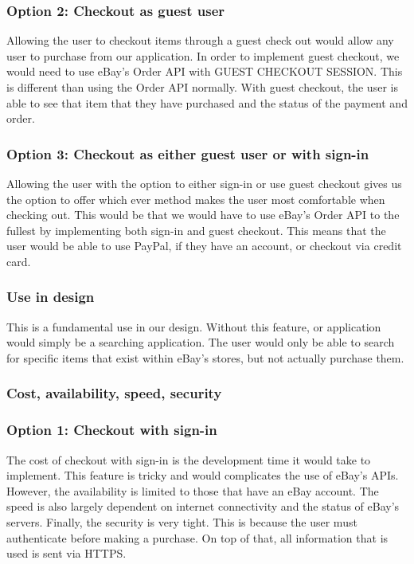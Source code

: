 \documentclass[journal,compsoc, 10pt, draftclsnofoot, onecolumn]{IEEEtran}
\begin{document}
\subsubsection*{Option 2: Checkout as guest user}
Allowing the user to checkout items through a guest check out would allow any
user to purchase from our application. In order to implement guest checkout, we
would need to use eBay's Order API with GUEST CHECKOUT SESSION. This is
different than using the Order API normally. With guest checkout, the user is
able to see that item that they have purchased and the status of the payment and
 order.

\subsubsection*{Option 3: Checkout as either guest user or with sign-in}
Allowing the user with the option to either sign-in or use guest checkout gives
us the option to offer which ever method makes the user most comfortable when
checking out. This would be that we would have to use eBay's Order API to the
fullest by implementing both sign-in and guest checkout. This means that the
user would be able to use PayPal, if they have an account, or checkout via
credit card.

\subsubsection{Use in design}
This is a fundamental use in our design. Without this feature, or application
would simply be a searching application. The user would only be able to search
for specific items that exist within eBay's stores, but not actually purchase
them.

\subsubsection{Cost, availability, speed, security}
\subsubsection*{Option 1: Checkout with sign-in}
The cost of checkout with sign-in is the development time it would take to
implement. This feature is tricky and would complicates the use of eBay's APIs.
However, the availability is limited to those that have an eBay account. The
speed is also largely dependent on internet connectivity and the status of
eBay's servers. Finally, the security is very tight. This is because the user
must authenticate before making a purchase. On top of that, all information that 
is used is sent via HTTPS.
\end{document}
